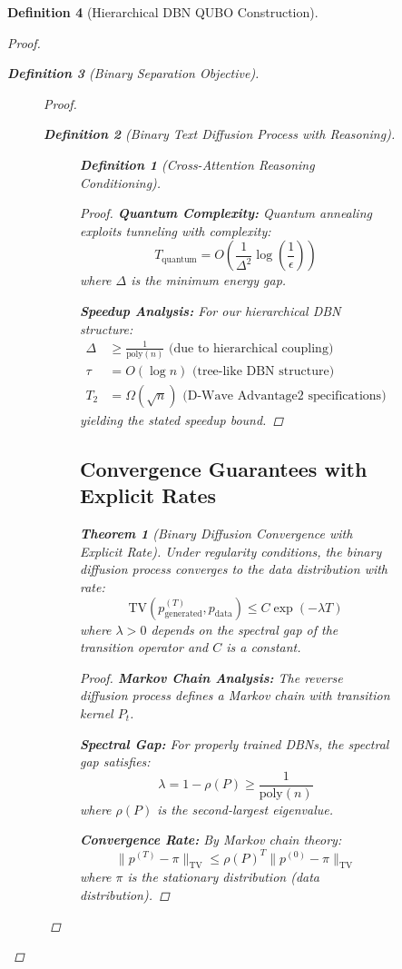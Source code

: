 \documentclass{article}
\newtheorem{theorem}{Theorem}
\newtheorem{definition}{Definition}
\begin{document}
\begin{definition}[Hierarchical DBN QUBO Construction]
\begin{proof}
\begin{definition}[Binary Separation Objective]
\begin{figure}[H]
\begin{proof}
\begin{definition}[Binary Text Diffusion Process with Reasoning]
\begin{figure}[H]
\begin{definition}[Cross-Attention Reasoning Conditioning]
\begin{proof}
\textbf{Quantum Complexity:} Quantum annealing exploits tunneling with complexity:
\begin{equation}
T_{\text{quantum}} = O\left(\frac{1}{\Delta^2} \log\left(\frac{1}{\epsilon}\right)\right)
\end{equation}
where $\Delta$ is the minimum energy gap.

\textbf{Speedup Analysis:} For our hierarchical DBN structure:
\begin{align}
\Delta &\geq \frac{1}{\text{poly}(n)} \text{ (due to hierarchical coupling)}\\
\tau &= O(\log n) \text{ (tree-like DBN structure)}\\
T_2 &= \Omega(\sqrt{n}) \text{ (D-Wave Advantage2 specifications)}
\end{align}
yielding the stated speedup bound.
\end{proof}

\subsection{Convergence Guarantees with Explicit Rates}

\begin{theorem}[Binary Diffusion Convergence with Explicit Rate]
Under regularity conditions, the binary diffusion process converges to the data distribution with rate:
\begin{equation}
\text{TV}(p_{\text{generated}}^{(T)}, p_{\text{data}}) \leq C \exp(-\lambda T)
\end{equation}
where $\lambda > 0$ depends on the spectral gap of the transition operator and $C$ is a constant.
\end{theorem}

\begin{proof}
\textbf{Markov Chain Analysis:} The reverse diffusion process defines a Markov chain with transition kernel $P_t$.

\textbf{Spectral Gap:} For properly trained DBNs, the spectral gap satisfies:
\begin{equation}
\lambda = 1 - \rho(P) \geq \frac{1}{\text{poly}(n)}
\end{equation}
where $\rho(P)$ is the second-largest eigenvalue.

\textbf{Convergence Rate:} By Markov chain theory:
\begin{equation}
\|p^{(T)} - \pi\|_{\text{TV}} \leq \rho(P)^T \|p^{(0)} - \pi\|_{\text{TV}}
\end{equation}
where $\pi$ is the stationary distribution (data distribution).
\end{proof}


\end{definition}
\end{figure}
\end{definition}
\end{proof}
\end{figure}
\end{definition}
\end{proof}
\end{definition}
\end{document}

